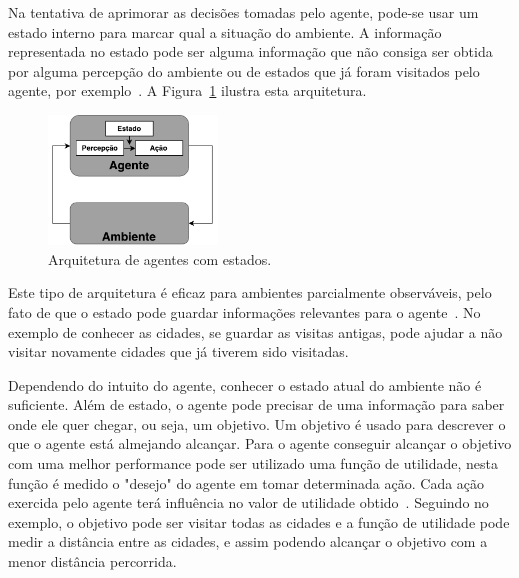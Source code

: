 Na tentativa de aprimorar as decisões tomadas pelo agente, pode-se usar um estado interno para marcar qual a situação do ambiente. A informação representada no estado pode ser alguma informação que não consiga ser obtida por alguma percepção do ambiente ou de estados que já foram visitados pelo agente, por exemplo~\cite[Capítulo 7]{intelligence2003modern}. A Figura~\ref{fig:agenteModelbased} ilustra esta arquitetura. 

\begin{figure}[ht]
	\centering
	\includegraphics[width=0.4\textwidth]{fig/agentModel.pdf}
	\caption{Arquitetura de agentes com estados.}
	\label{fig:agenteModelbased}
\end{figure} 

Este tipo de arquitetura é eficaz para ambientes parcialmente observáveis, pelo fato de que o estado pode guardar informações relevantes para o agente~\cite[Capítulo 7]{intelligence2003modern}. No exemplo de conhecer as cidades, se guardar as visitas antigas, pode ajudar a não visitar novamente cidades que já tiverem sido visitadas. 

Dependendo do intuito do agente, conhecer o estado atual do ambiente não é suficiente. Além de estado, o agente pode precisar de uma informação para saber onde ele quer chegar, ou seja, um objetivo. Um objetivo é usado para descrever o que o agente está almejando alcançar. Para o agente conseguir alcançar o objetivo com uma melhor performance pode ser utilizado uma função de utilidade, nesta função é medido o "desejo" do agente em tomar determinada ação. Cada ação exercida pelo agente terá influência no valor de utilidade obtido~\cite[Capítulo 7]{intelligence2003modern}. Seguindo no exemplo, o objetivo pode ser visitar todas as cidades e a função de utilidade pode medir a distância entre as cidades, e assim podendo alcançar o objetivo com a menor distância percorrida. 


